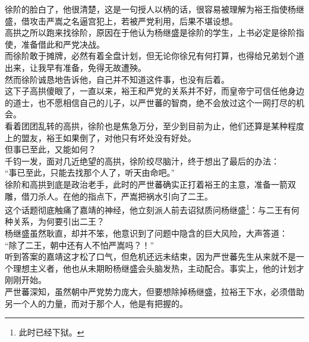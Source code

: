 \begin{multicols}{\theparacolNo}
徐阶的脸白了，他很清楚，这是一句授人以柄的话，很容易被理解为裕王指使杨继盛，借攻击严嵩之名逼宫犯上，若被严党利用，后果不堪设想。\\

高拱之所以跑来找徐阶，原因在于他认为杨继盛是徐阶的学生，上书必定是徐阶指使，准备借此和严党决战。\\

而徐阶敢于摊牌，必然有着全盘计划，但无论你徐兄有何打算，也得给兄弟划个道出来，让我早有准备，免得无故遭殃。\\

然而徐阶诚恳地告诉他，自己并不知道这件事，也没有后着。\\

这下子高拱傻眼了，一直以来，裕王和严党的关系并不好，而皇帝宁可信任他身边的道士，也不愿相信自己的儿子，以严世蕃的智商，绝不会放过这个一网打尽的机会。\\

看着团团乱转的高拱，徐阶也是焦急万分，至少到目前为止，他们还算是某种程度上的盟友，裕王如果倒了，对他只有坏处没有好处。\\

但事已至此，又能如何？\\

千钧一发，面对几近绝望的高拱，徐阶绞尽脑汁，终于想出了最后的办法：\\

“事已至此，只能去找那个人了，听天由命吧。”\\

徐阶和高拱到底是政治老手，此时的严世蕃确实正打着裕王的主意，准备一箭双雕，借刀杀人。在他的指点下，严嵩把祸水引向了二王。\\

这个话题彻底触痛了嘉靖的神经，他立刻派人前去诏狱质问杨继盛\footnote{此时已经下狱。}：与二王有何种关系，为何要引出二王？\\

杨继盛虽然耿直，却并不笨，他意识到了问题中隐含的巨大风险，大声答道：\\

“除了二王，朝中还有人不怕严嵩吗？！”\\

听到答案的嘉靖这才松了口气，但危机还远未结束，因为严世蕃先生从来就不是一个理想主义者，他也从未期盼杨继盛会头脑发热，主动配合。事实上，他的计划才刚刚开始。\\

严世蕃深知，虽然朝中严党势力庞大，但要想除掉杨继盛，拉裕王下水，必须借助另一个人的力量，而对于那个人，他是有把握的。\\


\end{multicols}
